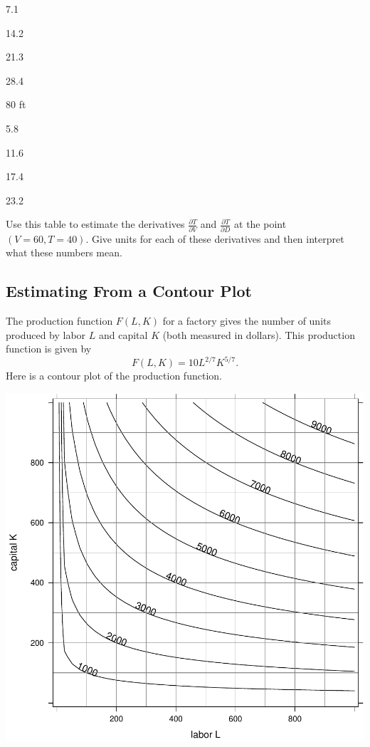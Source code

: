 \documentclass[
]{book}
\begin{document}
7.1

14.2

21.3

28.4

80 ft

5.8

11.6

17.4

23.2

Use this table to estimate the derivatives
\(\displaystyle{\frac{\partial T}{\partial V}}\) and \(\displaystyle{\frac{\partial T}{\partial D}}\) at the point \((V=60, T=40)\). Give units for each of these derivatives and then interpret what these numbers mean.

\hypertarget{estimating-from-a-contour-plot}{%
\subsection{Estimating From a Contour Plot}\label{estimating-from-a-contour-plot}}

The production function \(F(L,K)\) for a factory gives the number of units produced by labor \(L\) and capital \(K\) (both measured in dollars). This production function is given by
\[
F(L,K) = 10 L^{2/7}K^{5/7}.
\]
Here is a contour plot of the production function.

\includegraphics{_bookdown_files/math135_handbook_files/figure-latex/unnamed-chunk-90-1.pdf}
\end{document}
